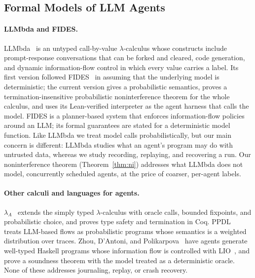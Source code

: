 
\subsection{Formal Models of LLM Agents}

\paragraph{LLMbda and FIDES.}
LLMbda~\citep{garby2026llmbda} is an untyped call-by-value $\lambda$-calculus whose constructs
include prompt-response conversations that can be forked and cleared, code generation, and
dynamic information-flow control in which every value carries a label.
Its first version followed FIDES~\citep{costa2025fides} in assuming that the underlying model is
deterministic; the current version gives a probabilistic semantics, proves a
termination-insensitive probabilistic noninterference theorem for the whole calculus, and uses
its Lean-verified interpreter as the agent harness that calls the model.
FIDES is a planner-based system that enforces information-flow policies around an LLM; its
formal guarantees are stated for a deterministic model function.
Like LLMbda we treat model calls probabilistically, but our main concern is different: LLMbda
studies what an agent's program may do with untrusted data, whereas we study recording,
replaying, and recovering a run. Our noninterference theorem (Theorem~\ref{thm:ni}) addresses
what LLMbda does not model, concurrently scheduled agents, at the price of coarser, per-agent
labels.

\paragraph{Other calculi and languages for agents.}
$\lambda_A$~\citep{liu2026lambdaA} extends the simply typed $\lambda$-calculus with oracle calls,
bounded fixpoints, and probabilistic choice, and proves type safety and termination in Coq.
PPDL~\citep{mandel2026ppdl} treats LLM-based flows as probabilistic programs whose semantics is a
weighted distribution over traces.
Zhou, D'Antoni, and Polikarpova~\citep{zhou2026lbac} have agents generate well-typed Haskell
programs whose information flow is controlled with LIO~\citep{stefan2011lio}, and prove a
soundness theorem with the model treated as a deterministic oracle.
None of these addresses journaling, replay, or crash recovery.

